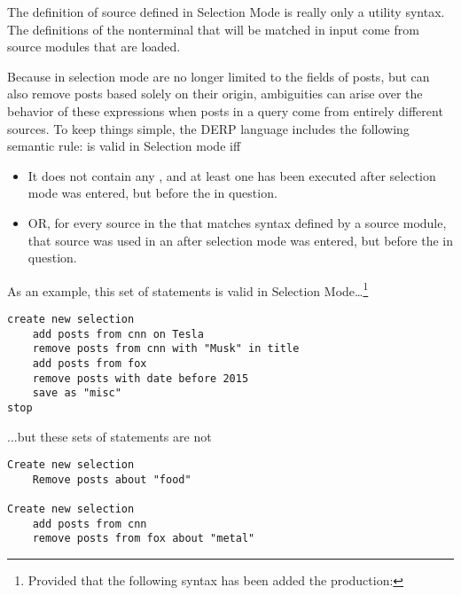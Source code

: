 The definition of source defined in Selection Mode is really only a utility syntax. The definitions of the nonterminal that will be matched in input come
from source modules that are loaded.

Because  in selection mode are no longer limited to the fields of posts, but can also remove posts based solely on their origin, ambiguities
can arise over the behavior of these expressions when posts in a query come from entirely different sources. To keep things simple, the DERP language includes
the following semantic rule:  is valid in Selection mode iff
\begin{itemize}
\item It does not contain any , and at least one  has been executed after selection mode was entered, but before the  in question.
\item OR, for every source in the  that matches syntax defined by a source module, that source was used in an  after selection mode was entered, but before the  in question.
\end{itemize}
As an example, this set of statements is valid in Selection Mode…\footnote{Provided that the following syntax has been added the production: \hspace{.25in}  \bnf{:}  \bnf{|} }

\begin{lstlisting}
create new selection
    add posts from cnn on Tesla
    remove posts from cnn with "Musk" in title
    add posts from fox
    remove posts with date before 2015
    save as "misc"
stop
\end{lstlisting}
...but these sets of statements are not
\begin{lstlisting}
Create new selection
    Remove posts about "food"

Create new selection
    add posts from cnn
    remove posts from fox about "metal"
\end{lstlisting}
